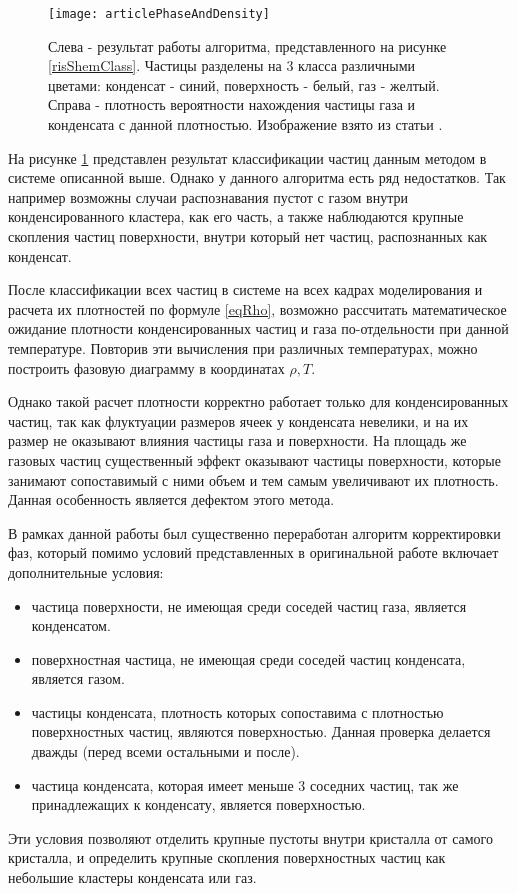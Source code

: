 \begin{figure}[h]
\begin{center}
\texttt{[image: articlePhaseAndDensity]}
\caption{Слева - результат работы алгоритма, представленного на рисунке \ref{risShemClass}. Частицы разделены на 3 класса различными цветами: конденсат - синий, поверхность - белый, газ - желтый. Справа - плотность вероятности нахождения частицы газа и конденсата с данной плотностью. Изображение взято из статьи \cite{Ovcharov2017}.}
\label{risClassification}
\end{center}
\end{figure}

На рисунке \ref{risClassification} представлен результат классификации частиц данным методом в системе описанной выше.
Однако у данного алгоритма есть ряд недостатков. Так например возможны случаи распознавания пустот с газом внутри конденсированного кластера, как его часть, а также наблюдаются крупные скопления частиц поверхности, внутри который нет частиц, распознанных как конденсат.

После классификации всех частиц в системе на всех кадрах моделирования и расчета их плотностей по формуле \ref{eqRho}, возможно рассчитать математическое ожидание плотности конденсированных частиц и газа по-отдельности при данной температуре.
Повторив эти вычисления при различных температурах, можно построить фазовую диаграмму в координатах $\rho, T$.

Однако такой расчет плотности корректно работает только для конденсированных частиц, так как флуктуации размеров ячеек у конденсата невелики, и на их размер не оказывают влияния частицы газа и поверхности. На площадь же газовых частиц существенный эффект оказывают частицы поверхности, которые занимают сопоставимый с ними объем и тем самым увеличивают их плотность. Данная особенность является дефектом этого метода.

В рамках данной работы был существенно переработан алгоритм корректировки фаз, который помимо условий представленных в оригинальной работе включает дополнительные условия:
\begin{itemize}
\item частица поверхности, не имеющая среди соседей частиц газа, является конденсатом.
\item поверхностная частица, не имеющая среди соседей частиц конденсата, является газом.
\item частицы конденсата, плотность которых сопоставима с плотностью поверхностных частиц, являются поверхностью. Данная проверка делается дважды (перед всеми остальными и после).
\item частица конденсата, которая имеет меньше 3 соседних частиц, так же принадлежащих к конденсату, является поверхностью.
\end{itemize}
Эти условия позволяют отделить крупные пустоты внутри кристалла от самого кристалла, и определить крупные скопления поверхностных частиц как небольшие кластеры конденсата или газ.

